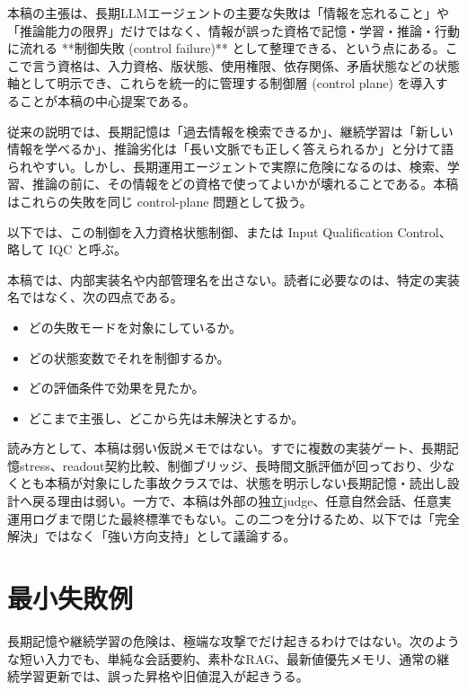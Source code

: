 \documentclass[12pt,a4paper]{article}
\begin{document}
本稿の主張は、長期LLMエージェントの主要な失敗は「情報を忘れること」や「推論能力の限界」だけではなく、情報が誤った資格で記憶・学習・推論・行動に流れる **制御失敗 (control failure)** として整理できる、という点にある。ここで言う資格は、入力資格、版状態、使用権限、依存関係、矛盾状態などの状態軸として明示でき、これらを統一的に管理する制御層 (control plane) を導入することが本稿の中心提案である。

従来の説明では、長期記憶は「過去情報を検索できるか」、継続学習は「新しい情報を学べるか」、推論劣化は「長い文脈でも正しく答えられるか」と分けて語られやすい。しかし、長期運用エージェントで実際に危険になるのは、検索、学習、推論の前に、その情報をどの資格で使ってよいかが壊れることである。本稿はこれらの失敗を同じ control-plane 問題として扱う。

以下では、この制御を入力資格状態制御、または Input Qualification Control、略して IQC と呼ぶ。

本稿では、内部実装名や内部管理名を出さない。読者に必要なのは、特定の実装名ではなく、次の四点である。

\begin{itemize}
\tightlist
\item
  どの失敗モードを対象にしているか。
\item
  どの状態変数でそれを制御するか。
\item
  どの評価条件で効果を見たか。
\item
  どこまで主張し、どこから先は未解決とするか。
\end{itemize}

読み方として、本稿は弱い仮説メモではない。すでに複数の実装ゲート、長期記憶stress、readout契約比較、制御ブリッジ、長時間文脈評価が回っており、少なくとも本稿が対象にした事故クラスでは、状態を明示しない長期記憶・読出し設計へ戻る理由は弱い。一方で、本稿は外部の独立judge、任意自然会話、任意実運用ログまで閉じた最終標準でもない。この二つを分けるため、以下では「完全解決」ではなく「強い方向支持」として議論する。

\section{最小失敗例}\label{ux6700ux5c0fux5931ux6557ux4f8b}

長期記憶や継続学習の危険は、極端な攻撃でだけ起きるわけではない。次のような短い入力でも、単純な会話要約、素朴なRAG、最新値優先メモリ、通常の継続学習更新では、誤った昇格や旧値混入が起きうる。

\begin{center}
\end{center}
\end{document}
